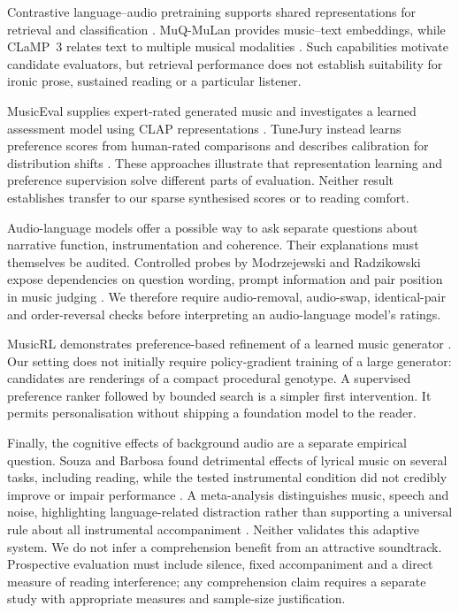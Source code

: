 \documentclass[11pt]{article}
\begin{document}
Contrastive language--audio pretraining supports shared representations for retrieval and classification \cite{clap}. MuQ-MuLan provides music--text embeddings, while CLaMP~3 relates text to multiple musical modalities \cite{muq,clamp}. Such capabilities motivate candidate evaluators, but retrieval performance does not establish suitability for ironic prose, sustained reading or a particular listener.

MusicEval supplies expert-rated generated music and investigates a learned assessment model using CLAP representations \cite{musiceval}. TuneJury instead learns preference scores from human-rated comparisons and describes calibration for distribution shifts \cite{tunejury}. These approaches illustrate that representation learning and preference supervision solve different parts of evaluation. Neither result establishes transfer to our sparse synthesised scores or to reading comfort.

Audio-language models offer a possible way to ask separate questions about narrative function, instrumentation and coherence. Their explanations must themselves be audited. Controlled probes by Modrzejewski and Radzikowski expose dependencies on question wording, prompt information and pair position in music judging \cite{judge}. We therefore require audio-removal, audio-swap, identical-pair and order-reversal checks before interpreting an audio-language model's ratings.

MusicRL demonstrates preference-based refinement of a learned music generator \cite{musicrl}. Our setting does not initially require policy-gradient training of a large generator: candidates are renderings of a compact procedural genotype. A supervised preference ranker followed by bounded search is a simpler first intervention. It permits personalisation without shipping a foundation model to the reader.

Finally, the cognitive effects of background audio are a separate empirical question. Souza and Barbosa found detrimental effects of lyrical music on several tasks, including reading, while the tested instrumental condition did not credibly improve or impair performance \cite{souza}. A meta-analysis distinguishes music, speech and noise, highlighting language-related distraction rather than supporting a universal rule about all instrumental accompaniment \cite{vasilev}. Neither validates this adaptive system. We do not infer a comprehension benefit from an attractive soundtrack. Prospective evaluation must include silence, fixed accompaniment and a direct measure of reading interference; any comprehension claim requires a separate study with appropriate measures and sample-size justification.
\end{document}
